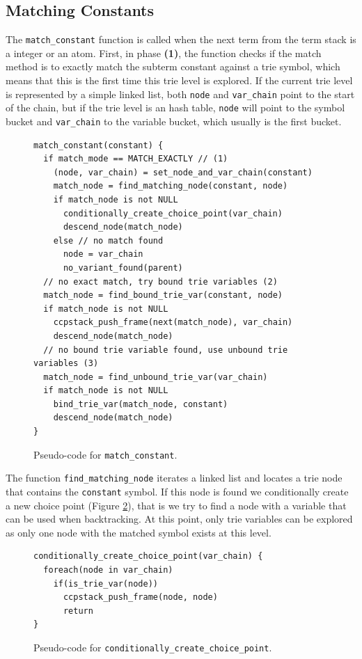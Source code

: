 \subsection{Matching Constants}

The \texttt{match\_constant} function is called when the next term from the term stack is a integer or an
atom. First, in phase \textbf{(1)}, the function checks if the match method is to exactly match the
subterm constant against a trie symbol, which means
that this is the first time this trie level is explored. If the current trie level is represented by a simple
linked list, both \texttt{node} and \texttt{var\_chain} point to the start of the chain, but if the trie level
is an hash table, \texttt{node} will point to the symbol bucket and \texttt{var\_chain} to the variable
bucket, which usually is the first bucket.

\begin{figure}[ht]
\begin{Verbatim}
match_constant(constant) {
  if match_mode == MATCH_EXACTLY // (1)
    (node, var_chain) = set_node_and_var_chain(constant)
    match_node = find_matching_node(constant, node)
    if match_node is not NULL
      conditionally_create_choice_point(var_chain)
      descend_node(match_node)
    else // no match found
      node = var_chain
      no_variant_found(parent)
  // no exact match, try bound trie variables (2)
  match_node = find_bound_trie_var(constant, node)
  if match_node is not NULL
    ccpstack_push_frame(next(match_node), var_chain)
    descend_node(match_node)
  // no bound trie variable found, use unbound trie variables (3)
  match_node = find_unbound_trie_var(var_chain)
  if match_node is not NULL
    bind_trie_var(match_node, constant)
    descend_node(match_node)
}
\end{Verbatim}
\caption{Pseudo-code for \texttt{match\_constant}.}
\label{fig:match_constant}
\end{figure}

The function \texttt{find\_matching\_node} iterates a linked list and locates a trie node that contains the
\texttt{constant} symbol. If this node is found we conditionally create a
new choice point (Figure \ref{fig:conditionally_create_choice_point}), that is
we try to find a node with a variable that can be used when backtracking. At this point, only
trie variables can be explored as only one node with the matched symbol exists at this level.

\begin{figure}[ht]
\begin{Verbatim}
conditionally_create_choice_point(var_chain) {
  foreach(node in var_chain)
    if(is_trie_var(node))
      ccpstack_push_frame(node, node)
      return
}
\end{Verbatim}
\caption{Pseudo-code for \texttt{conditionally\_create\_choice\_point}.}
\label{fig:conditionally_create_choice_point}
\end{figure}

